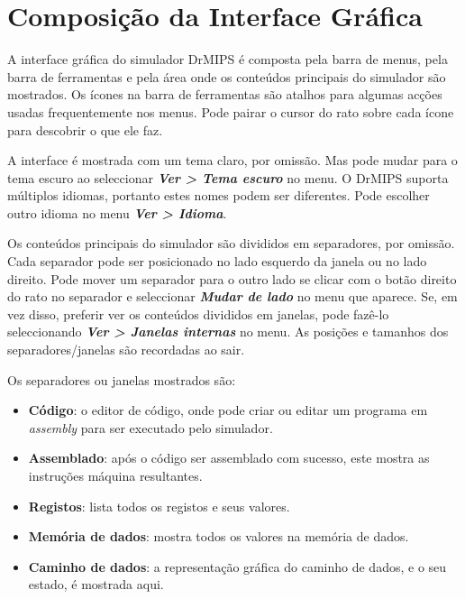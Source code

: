 \documentclass[11pt,a4paper,twoside,titlepage]{article}
\author{Bruno Nova}
\title{\Title}
\newcommand{\menupath}[1]{\textbf{\emph{#1}}}
\begin{document}
\maketitle
\tableofcontents
\newpage

\section{Composição da Interface Gráfica}

A interface gráfica do simulador DrMIPS é composta pela barra de menus, pela
barra de ferramentas e pela área onde os conteúdos principais do simulador são
mostrados.
Os ícones na barra de ferramentas são atalhos para algumas acções usadas
frequentemente nos menus. Pode pairar o cursor do rato sobre cada ícone para
descobrir o que ele faz.

A interface é mostrada com um tema claro, por omissão. Mas pode mudar para o
tema escuro ao seleccionar \menupath{Ver > Tema escuro} no menu.
O DrMIPS suporta múltiplos idiomas, portanto estes nomes podem ser diferentes.
Pode escolher outro idioma no menu \menupath{Ver > Idioma}.

Os conteúdos principais do simulador são divididos em separadores, por omissão.
Cada separador pode ser posicionado no lado esquerdo da janela ou no lado 
direito.
Pode mover um separador para o outro lado se clicar com o botão direito do rato
no separador e seleccionar \menupath{Mudar de lado} no menu que aparece.
Se, em vez disso, preferir ver os conteúdos divididos em janelas, pode fazê-lo
seleccionando \menupath{Ver > Janelas internas} no menu.
As posições e tamanhos dos separadores/janelas são recordadas ao sair.

Os separadores ou janelas mostrados são:
\begin{itemize}
	\item \textbf{Código}: o editor de código, onde pode criar ou editar um
		programa em \emph{assembly} para ser executado pelo simulador.
	\item \textbf{Assemblado}: após o código ser assemblado com sucesso, 
		este mostra as instruções máquina resultantes.
	\item \textbf{Registos}: lista todos os registos e seus valores.
	\item \textbf{Memória de dados}: mostra todos os valores na memória de 
		dados.
	\item \textbf{Caminho de dados}: a representação gráfica do caminho de
		dados, e o seu estado, é mostrada aqui.
\end{itemize}
\end{document}
